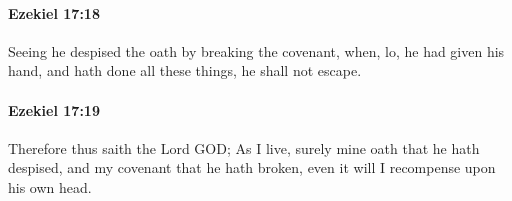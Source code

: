 		\paragraph{Ezekiel 17:18} %
			\label{EZEKIEL-17-18}

			Seeing he despised the oath by breaking the covenant, when, lo, he had given his hand, and hath done all these things, he shall not escape.


		\paragraph{Ezekiel 17:19} %
			\label{EZEKIEL-17-19}

			Therefore thus saith the Lord GOD; As I live, surely mine oath that he hath despised, and my covenant that he hath broken, even it will I recompense upon his own head.


